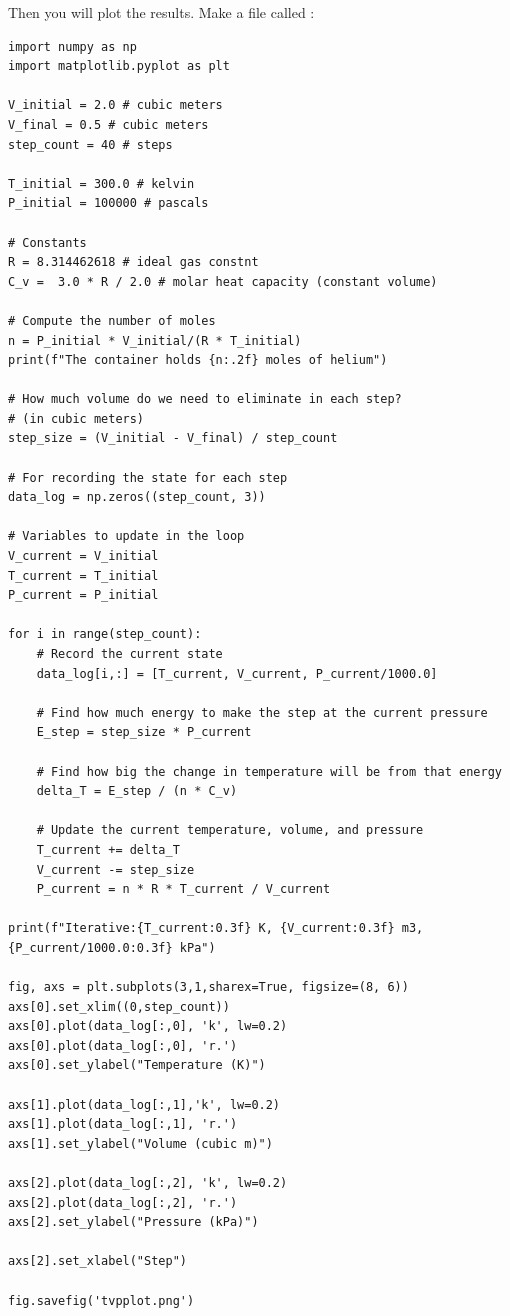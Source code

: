 Then you will plot the results.  Make a file called :

\begin{Verbatim}
import numpy as np
import matplotlib.pyplot as plt

V_initial = 2.0 # cubic meters
V_final = 0.5 # cubic meters
step_count = 40 # steps

T_initial = 300.0 # kelvin
P_initial = 100000 # pascals

# Constants
R = 8.314462618 # ideal gas constnt
C_v =  3.0 * R / 2.0 # molar heat capacity (constant volume)

# Compute the number of moles
n = P_initial * V_initial/(R * T_initial) 
print(f"The container holds {n:.2f} moles of helium")

# How much volume do we need to eliminate in each step? 
# (in cubic meters)
step_size = (V_initial - V_final) / step_count

# For recording the state for each step
data_log = np.zeros((step_count, 3))

# Variables to update in the loop
V_current = V_initial
T_current = T_initial
P_current = P_initial

for i in range(step_count):
    # Record the current state
    data_log[i,:] = [T_current, V_current, P_current/1000.0]

    # Find how much energy to make the step at the current pressure
    E_step = step_size * P_current

    # Find how big the change in temperature will be from that energy
    delta_T = E_step / (n * C_v)

    # Update the current temperature, volume, and pressure
    T_current += delta_T
    V_current -= step_size
    P_current = n * R * T_current / V_current

print(f"Iterative:{T_current:0.3f} K, {V_current:0.3f} m3, {P_current/1000.0:0.3f} kPa")

fig, axs = plt.subplots(3,1,sharex=True, figsize=(8, 6))
axs[0].set_xlim((0,step_count))
axs[0].plot(data_log[:,0], 'k', lw=0.2)
axs[0].plot(data_log[:,0], 'r.')
axs[0].set_ylabel("Temperature (K)")

axs[1].plot(data_log[:,1],'k', lw=0.2)
axs[1].plot(data_log[:,1], 'r.')
axs[1].set_ylabel("Volume (cubic m)")

axs[2].plot(data_log[:,2], 'k', lw=0.2)
axs[2].plot(data_log[:,2], 'r.')
axs[2].set_ylabel("Pressure (kPa)")

axs[2].set_xlabel("Step")

fig.savefig('tvpplot.png')
\end{Verbatim}

